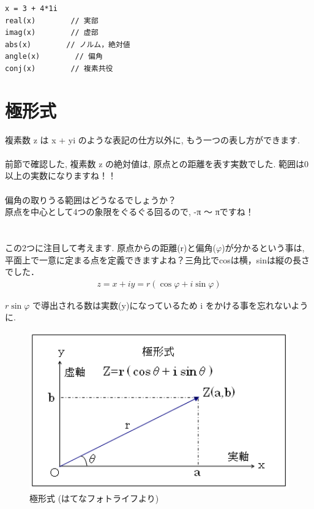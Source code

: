\documentclass[11pt,a4paper,uplatex]{ujreport}
\begin{document}
\begin{lstlisting}[caption=式(\ref{eq:vector}\ref{eq:conj})あたりのコード,label=sc:vector]
x = 3 + 4*1i
real(x)        // 実部
imag(x)        // 虚部
abs(x)        // ノルム，絶対値
angle(x)        // 偏角
conj(x)        // 複素共役
\end{lstlisting}

\section{極形式}
複素数 z は x + yi のような表記の仕方以外に, もう一つの表し方ができます.\\
\\
前節で確認した, 複素数 z の絶対値は, 原点との距離を表す実数でした. 範囲は0以上の実数になりますね！！\\
\\
偏角の取りうる範囲はどうなるでしょうか？\\
原点を中心として4つの象限をぐるぐる回るので, -π ～ πですね！\\
\\
\\
この2つに注目して考えます. 原点からの距離(r)と偏角($\varphi$)が分かるという事は, 平面上で一意に定まる点を定義できますよね？三角比でcosは横，sinは縦の長さでした．
\begin{eqnarray}
z = x + iy = r(\cos \varphi + i\sin \varphi)
\label{eq:kyoku}
\end{eqnarray}

$r\sin\varphi$ で導出される数は実数(y)になっているため i をかける事を忘れないように.\\

\begin{figure}[H]
\label{im:polar}
  \centering
  \includegraphics[width=120mm,bb=0 0 406 246]{../figures/polar.png}
  \caption{極形式 (はてなフォトライフより)}
\end{figure}
\end{document}
